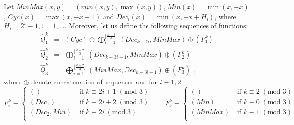\documentclass{llncs}
\begin{document}
\begin{definition}\label{def-Cyc}
Let $MinMax(x,y) = (min(x,y),\max(x,y))$, $Min(x) = \min(x,-x)$, $Cyc(x)
= \max(x,-x-1)$ and $Dec_i(x) = \min(x,-x+H_i)$, where $H_i = 2^i-1,
i=1,\ldots$. Moreover, let us define the following sequences of
functions:
\begin{eqnarray}
\hat{Q}^k_1 & = & (Cyc) \oplus 
\bigoplus_{i=1}^{\lfloor\frac{k-3}{3}\rfloor} 
                                 (Dec_{k-3i}, MinMax) \oplus (F^k_1) \\
\hat{Q}^k_2 & = & \bigoplus_{i=1}^{\lfloor\frac{k-2}{3}\rfloor} 
                                 (Dec_{k-3i+1}, MinMax) \oplus (F^k_2) \\
\hat{Q}^k_3 & = & \bigoplus_{i=1}^{\lfloor\frac{k-2}{3}\rfloor} 
                                 (MinMax, Dec_{k-3i-1}) \oplus (F^k_3)\enspace,
\end{eqnarray}
where $\oplus$ denote concatenation of sequences and for $i=1,2$ \[
F^k_i = \left\{
\begin{array}{ll}
() & \mbox{ if } k\equiv 2i+1 \;(\mbox{mod } 3) \\
(Dec_1) & \mbox{ if } k\equiv 2i+2 \;(\mbox{mod } 3)\\
(Dec_2,Min) & \mbox{ if } k\equiv 2i \;(\mbox{mod } 3)\\
\end{array}
\right. \qquad
F^k_3 = \left\{
\begin{array}{ll}
() & \mbox{ if }  k\equiv 2 \;(\mbox{mod } 3)\\
(Min) & \mbox{ if }  k\equiv 0 \;(\mbox{mod } 3)\\
(MinMax) & \mbox{ if }  k\equiv 1 \;(\mbox{mod } 3)\\
\end{array}
\right.\]
\end{definition}
\end{document}

